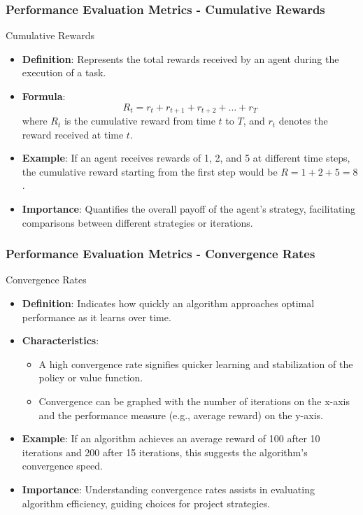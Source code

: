 \documentclass[aspectratio=169]{beamer}
\begin{document}
\begin{frame}[fragile]
    \frametitle{Performance Evaluation Metrics - Cumulative Rewards}
    \begin{block}{Cumulative Rewards}
        \begin{itemize}
            \item \textbf{Definition}: Represents the total rewards received by an agent during the execution of a task.
            \item \textbf{Formula}: 
            \[
            R_t = r_t + r_{t+1} + r_{t+2} + \ldots + r_T
            \]
            where \( R_t \) is the cumulative reward from time \( t \) to \( T \), and \( r_t \) denotes the reward received at time \( t \).
            \item \textbf{Example}: If an agent receives rewards of 1, 2, and 5 at different time steps, the cumulative reward starting from the first step would be \( R = 1 + 2 + 5 = 8 \).
            \item \textbf{Importance}: Quantifies the overall payoff of the agent’s strategy, facilitating comparisons between different strategies or iterations.
        \end{itemize}
    \end{block}
\end{frame}

\begin{frame}[fragile]
    \frametitle{Performance Evaluation Metrics - Convergence Rates}
    \begin{block}{Convergence Rates}
        \begin{itemize}
            \item \textbf{Definition}: Indicates how quickly an algorithm approaches optimal performance as it learns over time. 
            \item \textbf{Characteristics}: 
            \begin{itemize}
                \item A high convergence rate signifies quicker learning and stabilization of the policy or value function.
                \item Convergence can be graphed with the number of iterations on the x-axis and the performance measure (e.g., average reward) on the y-axis.
            \end{itemize}
            \item \textbf{Example}: If an algorithm achieves an average reward of 100 after 10 iterations and 200 after 15 iterations, this suggests the algorithm's convergence speed.
            \item \textbf{Importance}: Understanding convergence rates assists in evaluating algorithm efficiency, guiding choices for project strategies.
        \end{itemize}
    \end{block}
\end{frame}
\end{document}
